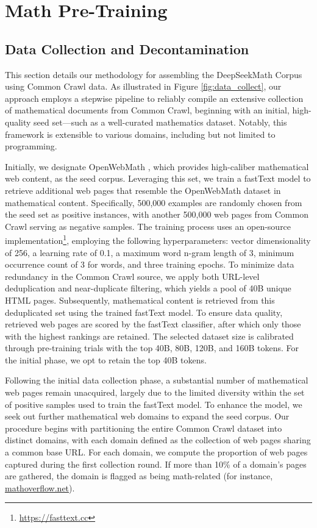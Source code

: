 \section{Math Pre-Training}

\subsection{Data Collection and Decontamination} This section details our methodology for assembling the DeepSeekMath Corpus using Common Crawl data. As illustrated in Figure \ref{fig:data_collect}, our approach employs a stepwise pipeline to reliably compile an extensive collection of mathematical documents from Common Crawl, beginning with an initial, high-quality seed set—such as a well-curated mathematics dataset. Notably, this framework is extensible to various domains, including but not limited to programming.

Initially, we designate OpenWebMath \citep{openwebmath}, which provides high-caliber mathematical web content, as the seed corpus. Leveraging this set, we train a fastText model \citep{joulin2016fasttext} to retrieve additional web pages that resemble the OpenWebMath dataset in mathematical content. Specifically, 500,000 examples are randomly chosen from the seed set as positive instances, with another 500,000 web pages from Common Crawl serving as negative samples. The training process uses an open-source implementation\footnote{\url{https://fasttext.cc}}, employing the following hyperparameters: vector dimensionality of 256, a learning rate of 0.1, a maximum word n-gram length of 3, minimum occurrence count of 3 for words, and three training epochs. To minimize data redundancy in the Common Crawl source, we apply both URL-level deduplication and near-duplicate filtering, which yields a pool of 40B unique HTML pages. Subsequently, mathematical content is retrieved from this deduplicated set using the trained fastText model. To ensure data quality, retrieved web pages are scored by the fastText classifier, after which only those with the highest rankings are retained. The selected dataset size is calibrated through pre-training trials with the top 40B, 80B, 120B, and 160B tokens. For the initial phase, we opt to retain the top 40B tokens.

Following the initial data collection phase, a substantial number of mathematical web pages remain unacquired, largely due to the limited diversity within the set of positive samples used to train the fastText model. To enhance the model, we seek out further mathematical web domains to expand the seed corpus. Our procedure begins with partitioning the entire Common Crawl dataset into distinct domains, with each domain defined as the collection of web pages sharing a common base URL. For each domain, we compute the proportion of web pages captured during the first collection round. If more than 10\% of a domain’s pages are gathered, the domain is flagged as being math-related (for instance, \url{mathoverflow.net}).

